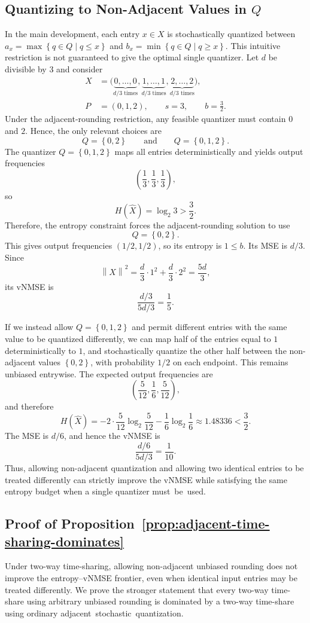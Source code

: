 \documentclass[11pt,letterpaper]{article}
\newcommand{\norm}[1]{\left\lVert#1\right\rVert}
\newcommand{\set}[1]{\left\{#1\right\}}
\begin{document}
{\subsection{Quantizing to Non-Adjacent Values in $Q$}
\label{app:timesharing-nonadjacent}
In the main development, each entry $x\in X$ is stochastically quantized
between
$a_x=\max\set{q\in Q\mid q\le x}$ and
$b_x=\min\set{q\in Q\mid q\ge x}$.
This intuitive restriction is not guaranteed to give the optimal single
quantizer. Let $d$ be divisible by $3$ and consider
\[
\begin{aligned}
X&=\bigl(\underbrace{0,\ldots,0}_{d/3\text{ times}},
\underbrace{1,\ldots,1}_{d/3\text{ times}},
\underbrace{2,\ldots,2}_{d/3\text{ times}}\bigr),\\
P&=(0,1,2),\qquad s=3,\qquad b=\frac32.
\end{aligned}
\]
Under the adjacent-rounding restriction, any feasible quantizer must contain
$0$ and $2$. Hence, the only relevant choices are
\[
Q=\set{0,2}
\qquad\text{and}\qquad
Q=\set{0,1,2}.
\]
The quantizer $Q=\set{0,1,2}$ maps all entries deterministically and yields
output frequencies
\[
\left(\frac13,\frac13,\frac13\right),
\]
so
\[
H(\widehat X)=\log_2 3>\frac32.
\]
Therefore, the entropy constraint forces the adjacent-rounding solution to use
\[
Q=\set{0,2}.
\]
This gives output frequencies $(1/2,1/2)$, so its entropy is $1\le b$. Its MSE
is $d/3$. Since
\[
\norm{X}^2=\frac d3\cdot1^2+\frac d3\cdot2^2=\frac{5d}{3},
\]
its vNMSE is
\[
\frac{d/3}{5d/3}=\frac15.
\]


If we instead allow $Q=\set{0,1,2}$ and permit different entries with the same value to be quantized differently, we can map half of the entries equal
to $1$ deterministically to $1$, and stochastically quantize the other half
between the non-adjacent values $\set{0,2}$, with probability $1/2$ on each
endpoint. This remains unbiased entrywise. The expected output frequencies are
\[
\left(\frac{5}{12},\frac16,\frac{5}{12}\right),
\]
and therefore
\[
H(\widehat X)
=
-2\cdot\frac{5}{12}\log_2\frac{5}{12}
-\frac16\log_2\frac16
\approx1.48336
<\frac32.
\]
The MSE is $d/6$, and hence the vNMSE is
\[
\frac{d/6}{5d/3}=\frac1{10}.
\]
Thus, allowing non-adjacent quantization and allowing two identical entries to
be treated differently can strictly improve the vNMSE while satisfying the
same entropy budget when a single quantizer \mbox{must be used.}

\subsection{Proof of Proposition~\ref{prop:adjacent-time-sharing-dominates}}
\label{app:timesharing-proof}
Under two-way time-sharing, allowing non-adjacent unbiased rounding does not
improve the entropy--vNMSE frontier, even when identical input entries may be
treated differently. We prove the stronger statement that every two-way
time-share using arbitrary unbiased rounding is dominated by a two-way
time-share using ordinary \mbox{adjacent stochastic quantization.}

}
\end{document}
